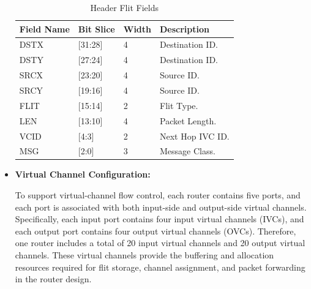 \begin{itemize}
\begin{table}[htbp]
    \centering
    \caption{Header Flit Fields}
    \label{tab:header_flit_fields}
    \begin{tabular}{llll}
        \hline
        \textbf{Field Name} & \textbf{Bit Slice} & \textbf{Width} & \textbf{Description} \\
        \hline
        DSTX & [31:28] & 4 & Destination ID. \\
        DSTY & [27:24] & 4 & Destination ID. \\
        SRCX & [23:20] & 4 & Source ID. \\
        SRCY & [19:16] & 4 & Source ID. \\
        FLIT & [15:14] & 2 & Flit Type. \\
        LEN  & [13:10] & 4 & Packet Length. \\
        VCID & [4:3]   & 2 & Next Hop IVC ID. \\
        MSG  & [2:0]   & 3 & Message Class. \\
        \hline
    \end{tabular}
\end{table}

    \item \textbf{Virtual Channel Configuration:}

    To support virtual-channel flow control, each router contains five ports, and each port is associated with both input-side and output-side virtual channels. Specifically, each input port contains four input virtual channels (IVCs), and each output port contains four output virtual channels (OVCs). Therefore, one router includes a total of 20 input virtual channels and 20 output virtual channels. These virtual channels provide the buffering and allocation resources required for flit storage, channel assignment, and packet forwarding in the router design.
\end{itemize}
